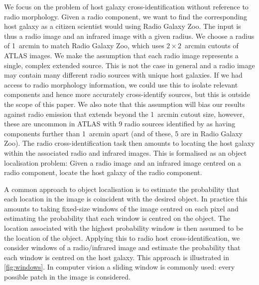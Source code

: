 \documentclass[fleqn,usenatbib,usedcolumn]{mnras}
\begin{document}
    We focus on the problem of host galaxy cross-identification without
    reference to radio morphology. Given a radio component, we want to find the
    corresponding host galaxy as a citizen scientist would using Radio Galaxy
    Zoo. The input is thus a radio image and an infrared image with a given
    radius. We choose a radius of 1~arcmin to match Radio Galaxy Zoo, which uses
    $2 \times 2$~arcmin cutouts of ATLAS images. We make the assumption that
    each radio image represents a single, complex extended source. This is not
    the case in general and a radio image may contain many different radio
    sources with unique host galaxies. If we had access to radio morphology
    information, we could use this to isolate relevant components and hence more
    accurately cross-identify sources, but this is outside the scope of this
    paper. We also note that this assumption will bias our results against radio
    emission that extends beyond the 1~arcmin cutout size, however, these are
    uncommon in ATLAS with 9 radio sources identified by \citet{norris06} as
    having components further than 1~arcmin apart (and of these, 5 are in Radio
    Galaxy Zoo). The radio cross-identification task then amounts to locating
    the host galaxy within the associated radio and infrared images. This is
    formalised as an object localisation problem: Given a radio image and an
    infrared image centred on a radio component, locate the host galaxy of the
    radio component.    %

   A common approach to object localisation is to estimate the probability
    that each location in the image is coincident with the desired object. In
    practice this amounts to taking fixed-size windows of the image centred on
    each pixel and estimating the probability that each window is centred on
    the object. The location associated with the highest probability window is
    then assumed to be the location of the object. Applying this to radio host
    cross-identification, we consider windows of a radio/infrared image and
    estimate the probability that each window is centred on the host galaxy.
    This approach is illustrated in \autoref{fig:windows}.
    In computer vision a sliding window is commonly used: every possible patch
    in the image is considered.
\end{document}
